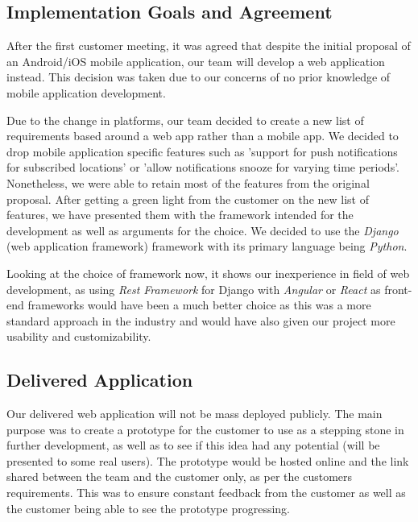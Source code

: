 \documentclass{l3proj}
\begin{document}
    \subsection{Implementation Goals and Agreement}
    \label{sec:imp_and_agr}
        After the first customer meeting, it was agreed that despite the initial proposal of an Android/iOS mobile application, our team will develop a web application instead. This decision was taken due to our concerns of no prior knowledge of mobile application development.
        

        Due to the change in platforms, our team decided to create a new list of requirements based around a web app rather than a mobile app. We decided to drop mobile application specific features such as 'support for push notifications for subscribed locations' or 'allow notifications snooze for varying time periods'. Nonetheless, we were able to retain most of the features from the original proposal. After getting a green light from the customer on the new list of features, we have presented them with the framework intended for the development as well as arguments for the choice. We decided to use the \textit{Django} (web application framework) \cite{django} framework with its primary language being \textit{Python}.

        

        Looking at the choice of framework now, it shows our inexperience in field of web development, as using \textit{Rest Framework} \cite{rest} for Django with \textit{Angular} \cite{angular} or \textit{React} \cite{react} as front-end frameworks would have been a much better choice as this was a more standard approach in the industry and would have also given our project more usability and customizability.
        
    \subsection{Delivered Application}
    \label{sec:delivered}
        Our delivered web application will not be mass deployed publicly. The main purpose was to create a prototype for the customer to use as a stepping stone in further development, as well as to see if this idea had any potential (will be presented to some real users). The prototype would be hosted online and the link shared between the team and the customer only, as per the customers requirements. This was to ensure constant feedback from the customer as well as the customer being able to see the prototype progressing. 
\end{document}
